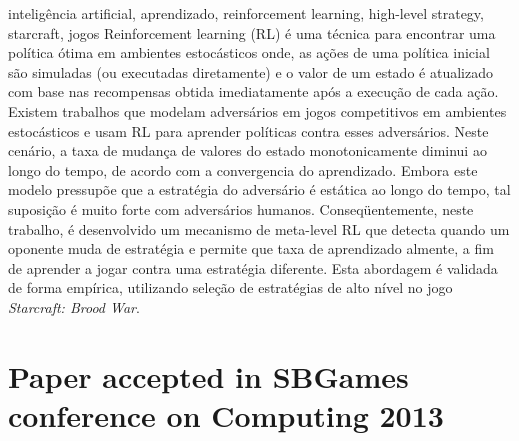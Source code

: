 \documentclass[english,twoside]{pucrs-ppgcc}
\begin{document}
\begin{resumo}{inteligência artificial, aprendizado, reinforcement learning, high-level strategy, starcraft, jogos}
Reinforcement learning (RL) é uma técnica para encontrar uma política ótima em ambientes estocásticos onde, as ações de uma política inicial são simuladas (ou executadas diretamente) e o valor de um estado é atualizado com base nas recompensas obtida imediatamente após a execução de cada ação.
Existem trabalhos que modelam adversários em jogos competitivos em ambientes estocásticos e usam RL para aprender políticas contra esses adversários.
Neste cenário, a taxa de mudança de valores do estado monotonicamente diminui ao longo do tempo, de acordo com a convergencia do aprendizado.
Embora este modelo pressupõe que a estratégia do adversário é estática ao longo do tempo, tal suposição é muito forte com adversários humanos.
Conseqüentemente, neste trabalho, é desenvolvido um mecanismo de meta-level RL que detecta quando um oponente muda de estratégia e permite que taxa de aprendizado almente, a fim de aprender a jogar contra uma estratégia diferente.
Esta abordagem é validada de forma empírica, utilizando seleção de estratégias de alto nível no jogo \textit{Starcraft: Brood War}.
\end{resumo}

\listoffigures
\listofalgorithms
\tableofcontents












%


\appendix
\chapter{Paper accepted in SBGames conference on Computing 2013}
\label{appendix:paper}

\end{document}

